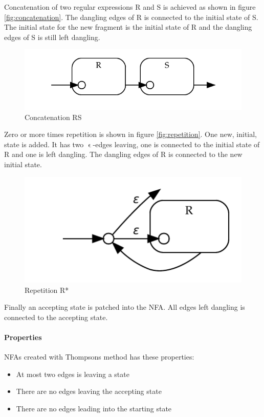 Concatenation of two regular expressions R and S is achieved as shown
in figure \vref{fig:concatenation}. The dangling edges of R is
connected to the initial state of S. The initial state for the new
fragment is the initial state of R and the dangling edges of S is
still left dangling.

\begin{figure}
  \centering
  \includegraphics{parsing/concatenation}
  \caption{Concatenation RS}
  \label{fig:concatenation}
\end{figure}

Zero or more times repetition is shown in figure
\vref{fig:repetition}. One new, initial, state is added. It has two
$\upvarepsilon$-edges leaving, one is connected to the initial state of
R and one is left dangling. The dangling edges of R is connected to
the new initial state.

\begin{figure}
  \centering
  \includegraphics{parsing/repetition}
  \caption{Repetition R*}
  \label{fig:repetition}
\end{figure}

Finally an accepting state is patched into the NFA. All edges left
dangling is connected to the accepting state. 

\paragraph{Properties} NFAs created with Thompsons method has these
properties:
\begin{itemize}
  \item At most two edges is leaving a state
  \item There are no edges leaving the accepting state
  \item There are no edges leading into the starting state
\end{itemize}


